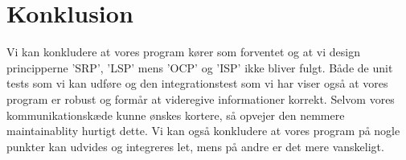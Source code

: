 \section{Konklusion}
Vi kan konkludere at vores program kører som forventet og at vi design principperne 'SRP', 'LSP' mens 'OCP' og 'ISP' ikke bliver fulgt. Både de unit tests som vi kan udføre og den integrationstest som vi har viser også at vores program er robust og formår at videregive informationer korrekt. Selvom vores kommunikationskæde kunne ønskes kortere, så opvejer den nemmere maintainablity hurtigt dette. Vi kan også konkludere at vores program på nogle punkter kan udvides og integreres let, mens på andre er det mere vanskeligt.
